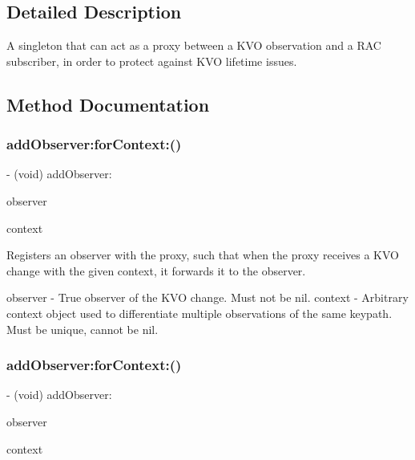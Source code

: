 \subsection{Detailed Description}
A singleton that can act as a proxy between a K\+VO observation and a R\+AC subscriber, in order to protect against K\+VO lifetime issues. 

\subsection{Method Documentation}
\mbox{\label{interface_r_a_c_k_v_o_proxy_a0ec4ef4f07c0068901c7d606de89a1fd}} 
\subsubsection{\texorpdfstring{add\+Observer\+:for\+Context\+:()}{addObserver:forContext:()}\hspace{0.1cm}{\footnotesize\ttfamily [1/3]}}
{\footnotesize\ttfamily -\/ (void) add\+Observer\+: \begin{DoxyParamCaption}\item[{(\+\_\+\+\_\+weak N\+S\+Object $\ast$)}]{observer }\item[{forContext:(void $\ast$)}]{context }\end{DoxyParamCaption}}

Registers an observer with the proxy, such that when the proxy receives a K\+VO change with the given context, it forwards it to the observer.

observer -\/ True observer of the K\+VO change. Must not be nil. context -\/ Arbitrary context object used to differentiate multiple observations of the same keypath. Must be unique, cannot be nil. \mbox{\label{interface_r_a_c_k_v_o_proxy_a0ec4ef4f07c0068901c7d606de89a1fd}} 
\subsubsection{\texorpdfstring{add\+Observer\+:for\+Context\+:()}{addObserver:forContext:()}\hspace{0.1cm}{\footnotesize\ttfamily [2/3]}}
{\footnotesize\ttfamily -\/ (void) add\+Observer\+: \begin{DoxyParamCaption}\item[{(\+\_\+\+\_\+weak N\+S\+Object $\ast$)}]{observer }\item[{forContext:(void $\ast$)}]{context }\end{DoxyParamCaption}}

